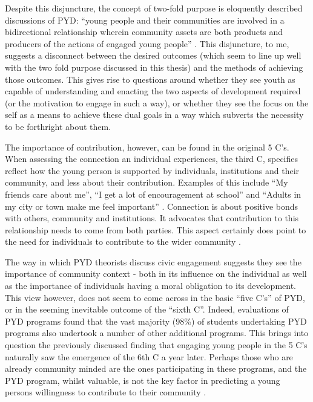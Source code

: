 Despite this disjuncture, the concept of two-fold purpose is eloquently described discussions of PYD: “young people and their communities are involved in a bidirectional relationship wherein community assets are both products and producers of the actions of engaged young people” \citep[][[p178]{Lerner2010}. This disjuncture, to me, suggests a disconnect between the desired outcomes (which seem to line up well with the two fold purpose discussed in this thesis) and the methods of achieving those outcomes. This gives rise to questions around whether they see youth as capable of understanding and enacting the two aspects of development required (or the motivation to engage in such a way), or whether they see the focus on the self as a means to achieve these dual goals in a way which subverts the necessity to be forthright about them. %

The importance of contribution, however, can be found in the original 5 C's. When assessing the connection an individual experiences, the third C, specifies reflect how the young person is supported by individuals, institutions and their community, and less about their contribution. Examples of this include “My friends care about me”, “I get a lot of encouragement at school” and “Adults in my city or town make me feel important” \citep{Jelicic2007}. Connection is about positive bonds with others, community and institutions. It advocates that contribution to this relationship needs to come from both parties. This aspect certainly does point to the need for individuals to contribute to the wider community \citep{Jelicic2007}.

The way in which PYD theorists \citep[such as][]{Lerner2010} discuss civic engagement suggests they see the importance of community context - both in its influence on the individual as well as the importance of individuals having a moral obligation to its development. This view however, does not seem to come across in the basic “five C's” of PYD, or in the seeming inevitable outcome of the “sixth C”. Indeed, evaluations of PYD programs found that the vast majority (98\%) of students undertaking PYD programs also undertook a number of other additional programs. This brings into question the previously discussed finding that engaging young people in the 5 C's naturally saw the emergence of the 6th C a year later. Perhaps those who are already community minded are the ones participating in these programs, and the PYD program, whilst valuable, is not the key factor in predicting a young persons willingness to contribute to their community \citep{Lerner2005a}.


